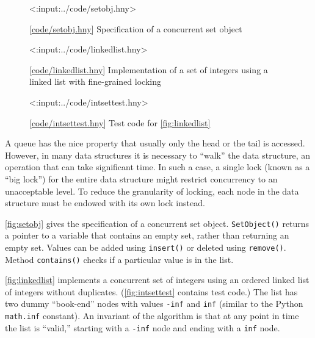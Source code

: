 \documentclass{report}
\newcommand{\harmonylink}[1]{%
[\href{https://harmony.cs.cornell.edu/#1}{\underline{#1}}]%
}
\newenvironment{code}{
\tcolorbox
}{
\endtcolorbox
}
\begin{document}
\begin{figure}
\begin{code}
<{:input:../code/setobj.hny}>
\end{code}
\caption{\harmonylink{code/setobj.hny} Specification of a concurrent
set object}
\label{fig:setobj}
\end{figure}

\begin{figure}
\begin{code}
<{:input:../code/linkedlist.hny}>
\end{code}
\caption{\harmonylink{code/linkedlist.hny} Implementation of a set of integers using a linked list with fine-grained locking}
\label{fig:linkedlist}
\end{figure}

\begin{figure}
\begin{code}
<{:input:../code/intsettest.hny}>
\end{code}
\caption{\harmonylink{code/intsettest.hny} Test code for \autoref{fig:linkedlist}}
\label{fig:intsettest}
\end{figure}

%
%
%
%
A queue has the nice property that usually only the head or the tail is accessed.
However, in many data structures it is necessary to ``walk'' the data structure,
an operation that can take significant time.
In such a case, a single lock (known as a ``big lock'')
for the entire data structure might restrict concurrency to an unacceptable level.
To reduce the granularity of locking, each node in the data structure must be
endowed with its own lock instead.

\autoref{fig:setobj} gives the specification of a concurrent set object.
\texttt{SetObject()} returns a pointer to a variable that
contains an empty set, rather than returning an empty set.
Values can be added using \texttt{insert()} or deleted using \texttt{remove()}.
Method \texttt{contains()} checks if a particular value is in the list.

\autoref{fig:linkedlist} implements a concurrent set of integers using
an ordered linked list of integers without duplicates.
(\autoref{fig:intsettest} contains test code.)
The list has two dummy ``book-end'' nodes with values \texttt{-inf} and
\texttt{inf} (similar to the Python \texttt{math.inf} constant).
An invariant of the algorithm is that at any point in time the
list is ``valid,'' starting with a \texttt{-inf} node and ending
with a \texttt{inf} node.
\end{document}
